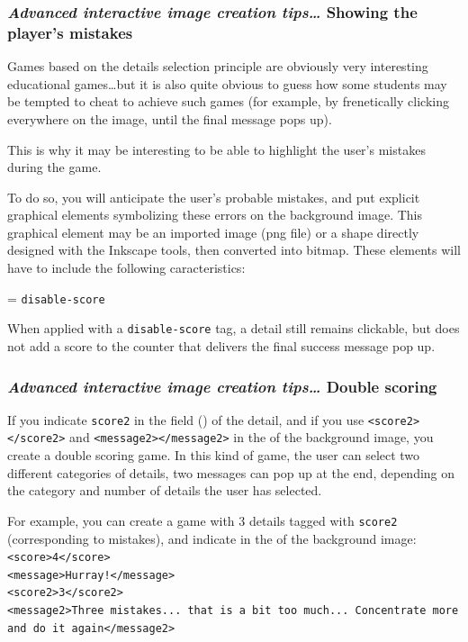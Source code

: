 \subsubsection{\emph{Advanced interactive image creation tips\ldots} Showing the player's mistakes}

Games based on the details selection principle are obviously very
interesting educational games\ldots but it is also quite obvious to guess how some 
students may be tempted to cheat to achieve such games (for example, by 
frenetically clicking everywhere on the image, until the final message pops up).

This is why it may be interesting to be able to 
highlight the user's mistakes during the game.

To do so, you will anticipate the user's probable mistakes, and 
put explicit graphical elements symbolizing these errors on the background image. 
This graphical element may be an imported image 
(png file) or a shape directly designed with the Inkscape tools, 
then converted into bitmap. These elements will have to include the following caracteristics:
\begin{center}
 = \verb|disable-score| 
\end{center}
When applied with a \verb|disable-score| tag, a detail still remains clickable, but does not 
add a score to the counter that delivers the final success message pop up.

\subsubsection{\emph{Advanced interactive image creation tips\ldots} Double scoring}

If you indicate \verb|score2| in the  field () of the detail,
and if you use \texttt{<score2></score2>} and  \texttt{<message2></message2>} in the  of the 
background image, you create a double scoring game. In this kind of game, the user can select two different categories of details, 
two messages can pop up at the end, depending on the category and number of details the user has selected.

For example, you can create a game with 3 details tagged with \texttt{score2} (corresponding to mistakes), and indicate in the  of the background image:\\
\texttt{<score>4</score>\\
<message>Hurray!</message>\\
<score2>3</score2>\\
<message2>Three mistakes... that is a bit too much... Concentrate more and do it again</message2>}\\


